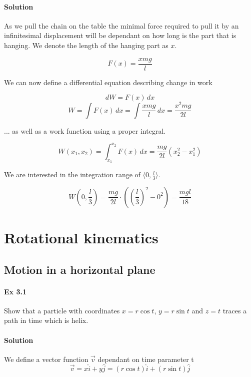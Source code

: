 \documentclass{article}
\begin{document}
\paragraph{Solution}
As we pull the chain on the table the minimal force required to pull it by an infinitesimal displacement will be dependant on how long is the part that is hanging. We denote the length of the hanging part as $x$.

\[ F(x) = \frac{xmg}{l} \]

We can now define a differential equation describing change in work

\[ dW = F(x) \, dx \]
\[ W = \int F(x) \, dx  = \int \frac{xmg}{l} \, dx = \frac{x^{2}mg}{2l} \]

... as well as a work function using a proper integral.

\[ W(x_{1}, x_{2}) = \int_{x_{1}}^{x_{2}} F(x) \, dx = \frac{mg}{2l} \left( x_{2}^{2} - x_{1}^{2} \right) \]

We are interested in the integration range of $\langle 0, \frac{l}{3} \rangle$.

\[ W \left( 0, \frac{l}{3} \right) = \frac{mg}{2l} \cdot \left( \left( \frac{l}{3} \right)^{2} - 0^{2} \right) = \frac{mgl}{18} \]


\section{Rotational kinematics}
\subsection{Motion in a horizontal plane}


\paragraph{Ex 3.1}
Show that a particle with coordinates ${x = r \cos{t}}$, ${y = r \sin{t}}$ and ${z = t}$ traces a path in time which is helix.
\paragraph{Solution}

We define a vector function $\vec{v}$ dependant on time parameter t
\[ \vec{v} = x \hat{i} + y \hat{j} = (r \cos{t}) \hat{i} + (r \sin{t}) \hat{j} \]
\end{document}
